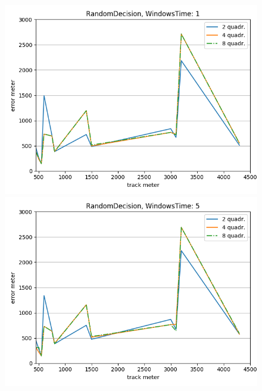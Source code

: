 \documentclass[12pt,a4paper,openright,twoside]{report}
\begin{document}
\begin{figure}[H]
\centering 
\includegraphics[scale=0.4]{thirdChartRandomDecision-1} 
\includegraphics[scale=0.4]{thirdChartRandomDecision-5} 
\end{figure}
\end{document}
